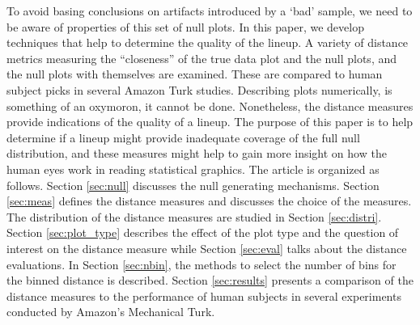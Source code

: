 \documentclass[12]{article}
\begin{document}
To avoid basing conclusions on artifacts introduced by a `bad' sample, we need to be aware of properties of this set of null plots. In this paper, we develop techniques that help to determine the quality of the lineup. A variety of distance metrics measuring the ``closeness'' of the true data plot and the null plots, and the null plots with themselves are examined. These are compared to human subject picks in several Amazon Turk studies.  Describing plots numerically, is something  of an oxymoron, it cannot be done. Nonetheless, the distance measures provide indications of the quality of a lineup. The purpose of this paper is to help determine if a lineup might provide inadequate coverage of the full null distribution, and these measures might help to gain more insight on how the human eyes work in reading statistical graphics. The article is organized as follows. Section \ref{sec:null} discusses the null generating mechanisms. Section \ref{sec:meas} defines the distance measures and discusses the choice of the measures. The distribution of the distance measures are studied in Section \ref{sec:distri}. Section \ref{sec:plot_type} describes the effect of the plot type and the question of interest on the distance measure while Section \ref{sec:eval} talks about the distance evaluations. In Section \ref{sec:nbin}, the methods to select the number of bins for the binned distance is described. Section \ref{sec:results} presents a comparison of the distance measures to the performance of human subjects in several experiments conducted by Amazon's Mechanical Turk.


\end{document}
